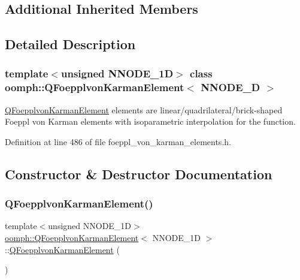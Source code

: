 \subsection*{Additional Inherited Members}


\subsection{Detailed Description}
\subsubsection*{template$<$unsigned N\+N\+O\+D\+E\+\_\+1D$>$\newline
class oomph\+::\+Q\+Foepplvon\+Karman\+Element$<$ N\+N\+O\+D\+E\+\_\+D $>$}

\hyperlink{classoomph_1_1QFoepplvonKarmanElement}{Q\+Foepplvon\+Karman\+Element} elements are linear/quadrilateral/brick-\/shaped Foeppl von Karman elements with isoparametric interpolation for the function. 

Definition at line 486 of file foeppl\+\_\+von\+\_\+karman\+\_\+elements.\+h.



\subsection{Constructor \& Destructor Documentation}
\mbox{\label{classoomph_1_1QFoepplvonKarmanElement_ab07e4a0c36aeee8d2915ba128b490fb9}} 
\subsubsection{\texorpdfstring{Q\+Foepplvon\+Karman\+Element()}{QFoepplvonKarmanElement()}\hspace{0.1cm}{\footnotesize\ttfamily [1/2]}}
{\footnotesize\ttfamily template$<$unsigned N\+N\+O\+D\+E\+\_\+1D$>$ \\
\hyperlink{classoomph_1_1QFoepplvonKarmanElement}{oomph\+::\+Q\+Foepplvon\+Karman\+Element}$<$ N\+N\+O\+D\+E\+\_\+1D $>$\+::\hyperlink{classoomph_1_1QFoepplvonKarmanElement}{Q\+Foepplvon\+Karman\+Element} (\begin{DoxyParamCaption}{ }\end{DoxyParamCaption})\hspace{0.3cm}{\ttfamily [inline]}}



